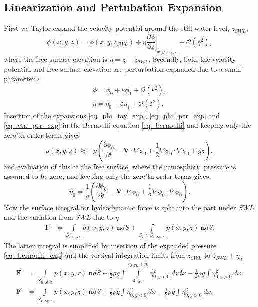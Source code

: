 \documentclass[A4paper,11pt]{marine_2023_Paper}
\newcommand{\V}[1]{\boldsymbol{#1}}
\newcommand{\D}[2]{\frac{\partial #1}{\partial #2}}
\begin{document}
\subsection{Linearization and Pertubation Expansion}
First we Taylor expand the velocity potential around the still water level, $z_{SWL}$,
\begin{equation}
	\phi(x,y,z) = \phi(x,y,z_{SWL}) + \eta \left.\D{\phi}{z}\right|_{x,y,z_{SWL}} + \mathcal{O}(\eta^2),
	\label{eq_phi_tay_exp}
\end{equation}
where the free surface elevation is $\eta = z-z_{SWL}$. Secondly, both the velocity potential and free surface elevation are perturbation expanded due to a small parameter $\varepsilon$
\begin{align}
	\phi = \phi_0 + \varepsilon \phi_1 + \mathcal{O}(\varepsilon^2), \label{eq_phi_per_exp} \\
	\eta = \eta_0 + \varepsilon \eta_1 + \mathcal{O}(\varepsilon^2).\label{eq_eta_per_exp}
\end{align}
Insertion of the expansions \eqref{eq_phi_tay_exp}, \eqref{eq_phi_per_exp} and \eqref{eq_eta_per_exp} in the Bernoulli equation \eqref{eq_bernoulli} and keeping only the zero'th order terms gives
\begin{equation}
	p(x, y, z) \approx -\rho \left(\D{\phi_0}{t} -\V{V} \cdot \nabla \phi_0 + \frac{1}{2} \nabla \phi_0 \cdot \nabla \phi_0 + gz \right),
	\label{eq_bernoulli_exp}
\end{equation}
and evaluation of this at the free surface, where the atmospheric pressure is assumed to be zero, and keeping only the zero'th order terms gives
\begin{equation}
	\eta_0 =  \frac{1}{g} \left(\D{\phi_0}{t} -\V{V} \cdot \nabla \phi_0 + \frac{1}{2} \nabla \phi_0 \cdot \nabla \phi_0\right).
\end{equation}
Now the surface integral for hydrodynamic force is split into the part under $SWL$ and the variation from $SWL$ due to $\eta$
\begin{align}
	\V{F} &= \int\limits_{S_{B,SWL}} p(x, y, z) ~\V{n} dS + \int\limits_{ S_B\backslash S_{B,SWL}} p(x, y, z) ~\V{n} dS.
\end{align}
The latter integral is simplified by insertion of the expanded pressure \eqref{eq_bernoulli_exp} and the vertical integration limits from $z_{SWL}$ to $z_{SWL}+\eta_0$
\begin{align}
	\V{F} &= \int\limits_{S_{B,SWL}} p(x, y, z) ~\V{n} dS + \frac{1}{2}\rho g\int \int\limits_{z_{SWL}}^{z_{SWL}+\eta_0}  \eta_{0,y<0}^2 ~dzdx- \frac{1}{2}\rho g\int\eta_{0,y>0}^2 ~ dx. \\
	\V{F} &= \int\limits_{S_{B,SWL}} p(x, y, z) ~\V{n} dS + \frac{1}{2}\rho g\int  \eta_{0,y<0}^2 ~dx- \frac{1}{2}\rho g\int\eta_{0,y>0}^2 ~ dx.
\end{align}
\end{document}
